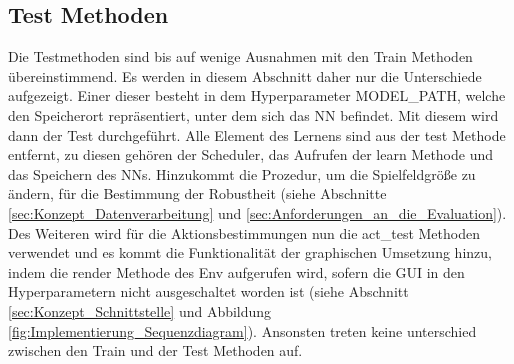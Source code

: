 \subsection{Test Methoden} \label{sec:Implementierung_test_Methode}
Die Testmethoden sind bis auf wenige Ausnahmen mit den Train Methoden übereinstimmend. Es werden in diesem Abschnitt daher nur die Unterschiede aufgezeigt. Einer dieser besteht in dem Hyperparameter MODEL\_PATH, welche den Speicherort repräsentiert, unter dem sich das NN befindet. Mit diesem wird dann der Test durchgeführt. Alle Element des Lernens sind aus der test Methode entfernt, zu diesen gehören der Scheduler, das Aufrufen der learn Methode und das Speichern des NNs.
Hinzukommt die Prozedur, um die Spielfeldgröße zu ändern, für die Bestimmung der Robustheit (siehe Abschnitte \ref{sec:Konzept_Datenverarbeitung} und \ref{sec:Anforderungen_an_die_Evaluation}).
Des Weiteren wird für die Aktionsbestimmungen nun die act\_test Methoden verwendet und es kommt die Funktionalität der graphischen Umsetzung hinzu, indem die render Methode des Env aufgerufen wird, sofern die GUI in den Hyperparametern nicht ausgeschaltet worden ist (siehe Abschnitt \ref{sec:Konzept_Schnittstelle} und Abbildung \ref{fig:Implementierung_Sequenzdiagram}).
Ansonsten treten keine unterschied zwischen den Train und der Test Methoden auf.

